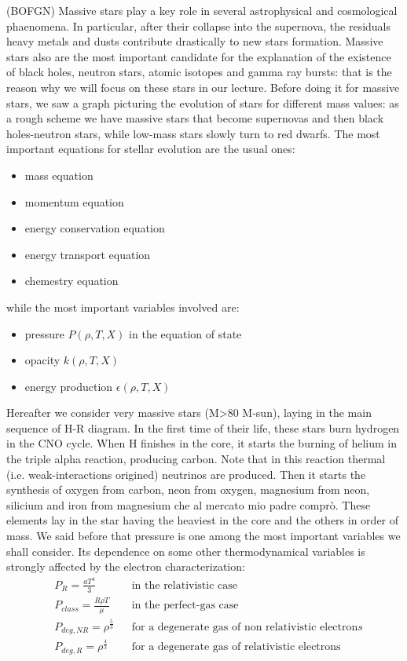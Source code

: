 \documentclass[main.tex]{subfiles}
\begin{document}
(BOFGN)
Massive stars play a key role in several astrophysical and cosmological phaenomena. In particular, after their collapse into the supernova, the residuals heavy metals and dusts contribute drastically to new stars formation. Massive stars also are the most important candidate for the explanation of the existence of black holes, neutron stars, atomic isotopes and gamma ray bursts: that is the reason why we will focus on these stars in our lecture. Before doing it for massive stars, we saw a graph picturing the evolution of stars for different mass values: as a rough scheme we have massive stars that become supernovas and then black holes-neutron stars, while low-mass stars slowly turn to red dwarfs.
The most important equations for stellar evolution are the usual ones:
\begin{itemize}
    \item mass equation
    \item momentum equation
    \item energy conservation equation
    \item energy transport equation
    \item chemestry equation
\end{itemize}
while the most important variables involved are:
\begin{itemize}
    \item pressure $P(\rho,T,X)$ in the equation of state
    \item opacity $k(\rho,T,X)$
    \item energy production $\epsilon(\rho,T,X)$
\end{itemize}
Hereafter we consider very massive stars (M>80 M-sun), laying in the main sequence of H-R diagram. In the first time of their life, these stars burn hydrogen in the CNO cycle. When H finishes in the core, it starts the burning of helium in the triple alpha reaction, producing carbon. Note that in this reaction thermal (i.e. weak-interactions origined) neutrinos are produced. Then it starts the synthesis of oxygen from carbon, neon from oxygen, magnesium from neon, silicium and iron from magnesium che al mercato mio padre comprò. These elements lay in the star having the heaviest in the core and the others in order of mass.
We said before that pressure is one among the most important variables we shall consider. Its dependence on some other thermodynamical variables is strongly affected by the electron characterization:
\begin{align}
&P_R=\frac{aT^4}{3} && \text{in the relativistic case}\\
&P_{class}=\frac{R\rho T}{\mu} && \text{in the perfect-gas case}\\
&P_{deg,NR}=\rho^{\frac{5}{3}} && \text{for a degenerate gas of non relativistic electron}s\\
&P_{deg,R}=\rho^{\frac{4}{3}} && \text{for a degenerate gas of relativistic electrons}
\end{align}
\end{document}
